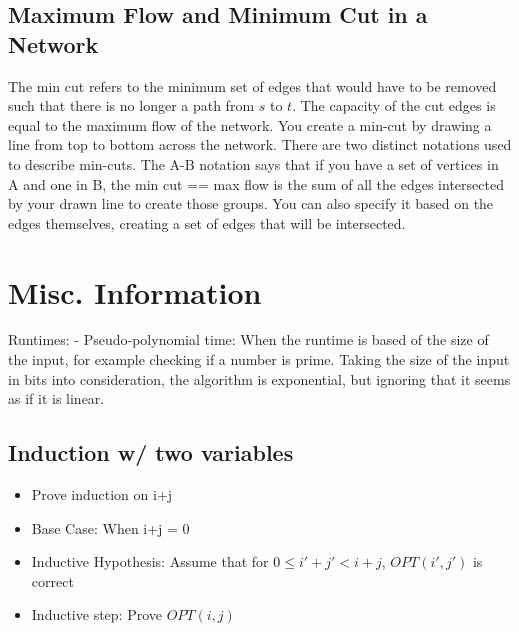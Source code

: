 \documentclass{article}
\begin{document}
\subsection{Maximum Flow and Minimum Cut in a Network}
The min cut refers to the minimum set of edges that would have to be removed such that there is no longer
a path from $s$ to $t$. The capacity of the cut edges is equal to the maximum flow of the network.
You create a min-cut by drawing a line from top to bottom across the network. There are two distinct
notations used to describe min-cuts. The A-B notation says that if you have a set of vertices in A
and one in B, the min cut == max flow is the sum of all the edges intersected by your drawn line to
create those groups. You can also specify it based on the edges themselves, creating a set of edges
that will be intersected. 

\section{Misc. Information}
Runtimes:
- Pseudo-polynomial time: When the runtime is based of the size of the input, for example checking
if a number is prime. Taking the size of the input in bits into consideration, the algorithm is
exponential, but ignoring that it seems as if it is linear. 


\subsection{Induction w/ two variables}
\begin{itemize}
    \item Prove induction on i+j
    \item Base Case: When i+j = 0
    \item Inductive Hypothesis: Assume that for $0 \le i' + j' < i+j$, $OPT(i', j')$ is correct
    \item Inductive step: Prove  $OPT(i, j)$
\end{itemize}
\end{document}
